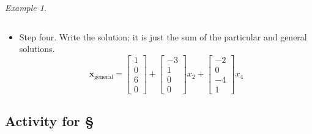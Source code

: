 \documentclass[11pt,oneside]{amsbook}
\theoremstyle{definition}
\theoremstyle{plain}
\theoremstyle{definition}
\theoremstyle{remark}
\newtheorem{example}[theorem]{Example}
\numberwithin{equation}{section}
\numberwithin{figure}{section}
\begin{document}
\begin{example}
\begin{itemize}
\[  \]
  \item Step four. Write the solution; it is just the sum of the particular and general solutions.
    \[\bm{x}_{\mathrm{general}}
      =\begin{bmatrix}1\\0\\6\\0\end{bmatrix}
      +\begin{bmatrix}-3\\1\\0\\0\end{bmatrix}x_2
      +\begin{bmatrix}-2\\0\\-4\\1\end{bmatrix}x_4
    \]
  \end{itemize}
\end{example}

\newpage
\subsection*{Activity for \S \thesection}
\end{document}
